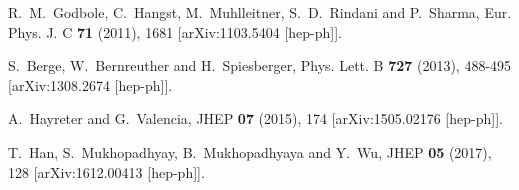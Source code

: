 \documentclass[pdftex,twocolumn,epjc3]{svjour3}          %
\begin{document}
\begin{thebibliography}{9}
R.~M.~Godbole, C.~Hangst, M.~Muhlleitner, S.~D.~Rindani and P.~Sharma,
Eur. Phys. J. C \textbf{71} (2011), 1681
[arXiv:1103.5404 [hep-ph]].


S.~Berge, W.~Bernreuther and H.~Spiesberger,
Phys. Lett. B \textbf{727} (2013), 488-495
[arXiv:1308.2674 [hep-ph]].



A.~Hayreter and G.~Valencia,
JHEP \textbf{07} (2015), 174
[arXiv:1505.02176 [hep-ph]].

T.~Han, S.~Mukhopadhyay, B.~Mukhopadhyaya and Y.~Wu,
JHEP \textbf{05} (2017), 128
[arXiv:1612.00413 [hep-ph]].


\end{thebibliography}
\end{document}
